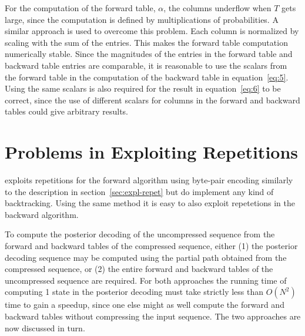 For the computation of the forward table, $\alpha$, the columns underflow when
$T$ gets large, since the computation is defined by multiplications of
probabilities. A similar approach is used to overcome this problem. Each column
is normalized by scaling with the sum of the entries. This makes the forward
table computation numerically stable. Since the magnitudes of the entries in
the forward table and backward table entries are comparable, it is reasonable
to use the scalars from the forward table in the computation of the backward
table in equation~\eqref{eq:5}. Using the same scalars is also required for the
result in equation~\eqref{eq:6} to be correct, since the use of different
scalars for columns in the forward and backward tables could give arbitrary
results.



\section{Problems in Exploiting Repetitions}
\label{sec:probl-expl-repet}

\citet{sand2013ziphmmlib} exploits repetitions for the forward algorithm using
byte-pair encoding similarly to the description in
section~\ref{sec:expl-repet} but do implement any kind of backtracking. Using
the same method it is easy to also exploit repetetions in the backward
algorithm.

To compute the posterior decoding of the uncompressed sequence from the
forward and backward tables of the compressed sequence, either (1) the
posterior decoding sequence may be computed using the partial path obtained
from the compressed sequence, or (2) the entire forward and backward tables of
the uncompressed sequence are required. For both approaches the running time of
computing 1 state in the posterior decoding must take strictly less than
$O\left(N^2\right)$ time to gain a speedup, since one else might as well compute the
forward and backward tables without compressing the input sequence. The two
approaches are now discussed in turn.

